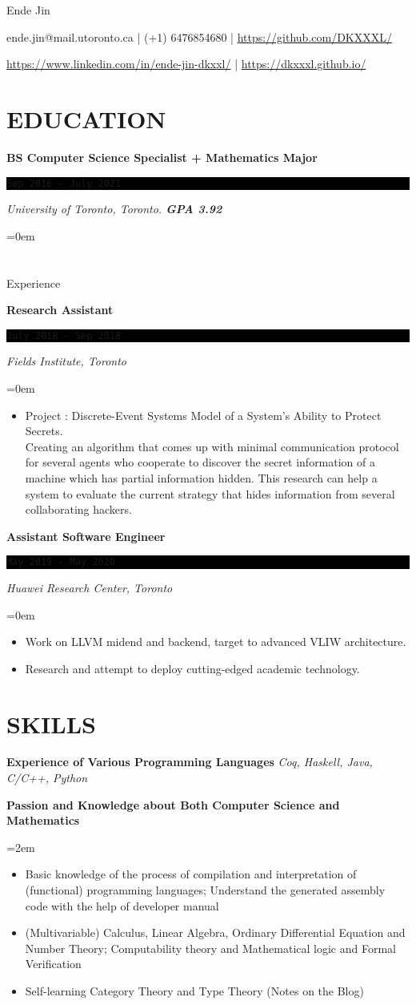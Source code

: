 \documentclass[fontsize=11pt]{article}
\newcommand{\MyName}[1]{ %
    \Huge \usefont{OT1}{phv}{b}{n} \hfill #1
    \par \normalsize \normalfont}
\newcommand{\NewPart}[1]{\section*{\uppercase{#1}}}
\newcommand{\SkillEntry}[2]{       %
    \noindent \textbf{#1} \hfill      %
        \noindent \textit{#2} \par        %
}
\newcommand{\SkillsEntry}[4]{       %
    \noindent \textbf{#1} \hfill      %
        \noindent \textit{#2} \par        %
    \noindent\hangindent=2em\hangafter=0 \small #4 %
    \normalsize \par}
\newcommand{\EducationEntry}[4]{
    \noindent \textbf{#1} \hfill      %
    \colorbox{Black}{ 
      \parbox{11em}{
      \centering \color{White}#2}} \par  %
    \noindent \textit{#3} \par        %
    \noindent\hangindent=0em\hangafter=0 \small #4 %
    \normalsize \par}
\newcommand{\WorkEntry}[4]{       %
    \noindent \textbf{#1} \hfill      %
    \colorbox{Black}{%
      \parbox{11em}{%
      \centering\color{White}#2}} \par   %
        \noindent \textit{#3} \par        %
    \noindent\hangindent=0em\hangafter=0 \small #4 %
    \normalsize \par}
\begin{document}
    
\MyName{Ende Jin}
\bigskip
{\small \hfill ende.jin@mail.utoronto.ca | (+1) 6476854680 | \url{https://github.com/DKXXXL/} \par
 \hfill  \url{https://www.linkedin.com/in/ende-jin-dkxxl/} | \url{https://dkxxxl.github.io/}}
\NewPart{Education}{}
\EducationEntry
{BS Computer Science Specialist + Mathematics Major}
{ \texttt{Sep 2016 - July 2021} }
{University of Toronto, Toronto.    \bf{GPA 3.92}}

\NewPart{Experience}{}

\WorkEntry
{Research Assistant}
{\texttt{July 2018 - Sep 2018}}
{Fields Institute, Toronto}
{\begin{itemize} \itemsep -1pt
    \item Project : Discrete-Event Systems Model of a System’s Ability to Protect Secrets. 
    \\ Creating an algorithm that comes up with minimal communication protocol for several agents who cooperate to discover the secret information of a machine which has partial information hidden. This research can help a system to evaluate the current strategy that hides information from several collaborating hackers.
    \end{itemize}}
    
\WorkEntry
{Assistant Software Engineer}
{\texttt{May 2019 - May 2020}}
{Huawei Research Center, Toronto}
{\begin{itemize} \itemsep -1pt
    \item Work on LLVM midend and backend, target to advanced VLIW architecture.
    \item Research and attempt to deploy cutting-edged academic technology.  
	\end{itemize}}
\NewPart{Skills}{}
\SkillEntry{Experience of Various Programming Languages}{Coq, Haskell, Java, C/C++, Python}

\SkillsEntry{Passion and Knowledge about Both Computer Science and Mathematics}{}{}{
    \begin{itemize} \itemsep -1pt
        \item Basic knowledge of the process of compilation and interpretation of (functional) programming languages;
        Understand the generated assembly code with the help of developer manual
        \item (Multivariable) Calculus, Linear Algebra, Ordinary Differential Equation and Number Theory; 
        Computability theory and Mathematical logic and Formal Verification
        \item Self-learning Category Theory and Type Theory (Notes on the Blog)
    \end{itemize}
}
\end{document}
